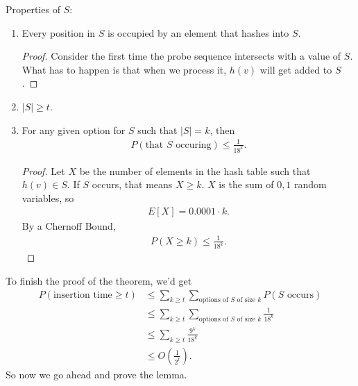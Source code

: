 \documentclass{report}
\begin{document}
\noindent Properties of $S$:
\begin{enumerate}
    \item Every position in $S$ is occupied by an element that hashes into $S$.
    \begin{proof}
        Consider the first time the probe sequence intersects with a value of $S$. What has to happen is that when we process it, $h(v)$ will get added to $S$.
    \end{proof}
    \item $|S| \geq t$. 
    \item For any given option for $S$ such that $|S| = k$, then
    \begin{align*}
        P(\text{that $S$ occuring}) \leq \frac{1}{18^k}.
    \end{align*}
    \begin{proof}
        Let $X$ be the number of elements in the hash table such that $h(v) \in S$. If $S$ occurs, that means $X \geq k$. $X$ is the sum of $0,1$ random variables, so
        \begin{align*}
            E[X] = 0.0001 \cdot k.
        \end{align*}
        By a Chernoff Bound,
        \begin{align*}
            P(X \geq k) \leq \frac{1}{18^k}.
        \end{align*}
    \end{proof}
\end{enumerate}
To finish the proof of the theorem, we'd get 
\begin{align*}
    P(\text{insertion time} \geq t) &\leq \sum_{k \geq t} \sum_{\text{options of $S$ of size $k$}} P(\text{$S$ occurs}) \\
    &\leq \sum_{k \geq t} \sum_{\text{options of $S$ of size $k$}} \frac{1}{18^k} \\
    &\leq \sum_{k \geq t} \frac{9^k}{18^k} \\
    &\leq O\left( \frac{1}{2^t}\right).
\end{align*}
So now we go ahead and prove the lemma.
\end{document}
